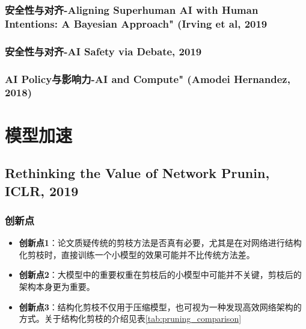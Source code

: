 \documentclass[twocolumn, 10pt]{article} %
\begin{document}
\subsubsection{安全性与对齐-Aligning Superhuman AI with Human Intentions: A Bayesian Approach" (Irving et al, 2019}

\subsubsection{安全性与对齐-AI Safety via Debate, 2019}



\subsubsection{AI Policy与影响力-AI and Compute" (Amodei  Hernandez, 2018)}



\section{模型加速}
\subsection{Rethinking the Value of Network Prunin, ICLR, 2019}

\subsubsection{创新点}

\begin{itemize}[left=2em] %
    \item \textbf{创新点1}：论文质疑传统的剪枝方法是否真有必要，尤其是在对网络进行结构化剪枝时，直接训练一个小模型的效果可能并不比传统方法差。

    \item \textbf{创新点2}：大模型中的重要权重在剪枝后的小模型中可能并不关键，剪枝后的架构本身更为重要。

    \item \textbf{创新点3}：结构化剪枝不仅用于压缩模型，也可视为一种发现高效网络架构的方式。关于结构化剪枝的介绍见表\ref{tab:pruning_comparison}
\end{itemize}
\end{document}
